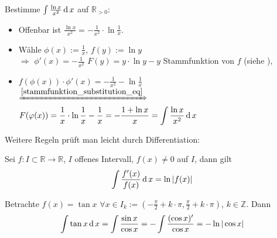 \begin{example}
	Bestimme $\int \frac{\ln x}{x^2} \operatorname{d} x$ auf $\mathbb{R}_{>0}$:
	
	\begin{itemize}
		\item Offenbar ist $\frac{\ln x}{x^2} = - \frac{1}{x^2}\cdot \ln \frac{1}{x}$.
	
		\item Wähle $\phi(x):= \frac{1}{x}$, $f(y):= \ln y$\\
		 $\Rightarrow$ $\phi'(x) = -\frac{1}{x^2}$ $F(y) = y\cdot \ln y - y$ Stammfunktion von $f$ (siehe ),
	
		\item  $f(\phi(x))\cdot \phi'(x) = - \frac{1}{x^2} - \ln \frac{1}{x}$ \\
		$\xRightarrow{\eqref{stammfunktion_substitution_eq}}$ $\displaystyle F(\varphi(x)) = \frac{1}{x}\cdot \ln \frac{1}{x} - \frac{1}{x} = - \frac{1 + \ln x}{x} = \int \frac{\ln x}{x^2} \operatorname{d} x$
	\end{itemize}
\end{example}

Weitere Regeln prüft man leicht durch Differentiation:
\begin{proposition}
	Sei $f:I\subset \mathbb{R}\to \mathbb{R}$, $I$ offenes Intervall, $f(x)\neq 0$ auf $I$, dann gilt \begin{align}
		\int \frac{f'(x)}{f(x)} \operatorname{d} x = \ln \vert f(x) \vert
	\end{align}
\end{proposition}

\begin{example}
	Betrachte $f(x) = \tan x$ $\forall x\in I_k:= \left( - \frac{\pi}{2} + k\cdot \pi, \frac{\pi}{2} + k\cdot \pi\right)$, $k\in\mathbb{Z}$. Dann \begin{align*}
		\int \tan x \operatorname{d} x = \int \frac{\sin x}{\cos x} = - \int \frac{(\cos x)'}{\cos x} = - \ln \vert \cos x \vert
	\end{align*}
\end{example}

